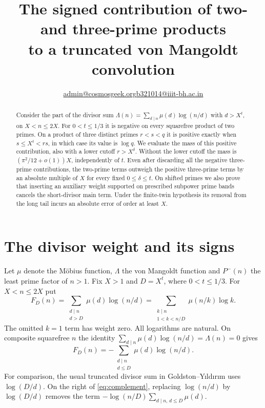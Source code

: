 \documentclass[11pt]{article}
\title{The signed contribution of two- and three-prime products\\
to a truncated von Mangoldt convolution}
\author{\small \href{mailto:admin@cosmosgeek.org}{admin@cosmosgeek.org}\qquad \href{mailto:b321014@iiit-bh.ac.in}{b321014@iiit-bh.ac.in}}
\date{}
\begin{document}
\maketitle
\begin{abstract}
Consider the part of the divisor sum
\(\Lambda(n)=\sum_{d\mid n}\mu(d)\log(n/d)\) with \(d>X^t\), on
\(X<n\le 2X\). For \(0<t\le 1/3\) it is negative on every squarefree
product of two primes. On a product of three distinct primes \(r<s<q\)
it is positive exactly when \(s\le X^t<rs\), in which case its value
is \(\log q\). We evaluate the mass of this positive contribution,
also with a lower cutoff \(r>X^\delta\). Without the lower cutoff the
mass is \((\pi^2/12+o(1))X\), independently of \(t\). Even after
discarding all the negative three-prime contributions, the two-prime
terms outweigh the positive three-prime terms by an absolute multiple
of \(X\) for every fixed \(0\le\delta\le t\). On shifted primes we also prove that inserting an auxiliary weight
supported on prescribed subpower prime bands cancels the short-divisor
main term. Under the finite-twin hypothesis its removal from the long
tail incurs an absolute error of order at least $X$.
\end{abstract}

\section{The divisor weight and its signs}

Let \(\mu\) denote the M\"obius function, \(\Lambda\) the von Mangoldt
function and \(P^-(n)\) the least prime factor of \(n>1\). Fix \(X>1\)
and \(D=X^t\), where \(0<t\le 1/3\). For \(X<n\le 2X\) put
\begin{equation}\label{eq:weight}
 F_D(n)=\sum_{\substack{d\mid n\\ d>D}}\mu(d)\log(n/d)
       =\sum_{\substack{k\mid n\\1<k<n/D}}\mu(n/k)\log k.
\end{equation}
The omitted \(k=1\) term has weight zero. All logarithms are natural.
On composite squarefree \(n\) the identity
\(\sum_{d\mid n}\mu(d)\log(n/d)=\Lambda(n)=0\) gives
\begin{equation}\label{eq:complement}
 F_D(n)=-\sum_{\substack{d\mid n\\d\le D}}\mu(d)\log(n/d).
\end{equation}
For comparison, the usual truncated divisor sum in
Goldston--Y{\i}ld{\i}r{\i}m \cite{GY} uses \(\log(D/d)\).
On the right of \eqref{eq:complement}, replacing \(\log(n/d)\) by
\(\log(D/d)\) removes the term
\(-\log(n/D)\sum_{d\mid n,\,d\le D}\mu(d)\).
\end{document}
